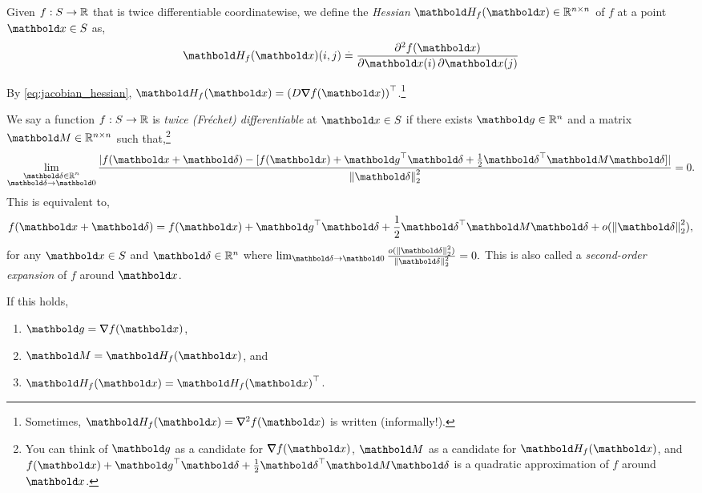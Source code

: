 \begin{defn}[Hessian] Given $f: S \to \mathbb{R}$ that is twice differentiable coordinatewise, we define the \emph{Hessian} $\mH_f(\vx) \in \R^{n \times n}$ of $f$ at a point $\vx \in \sS$ as, \begin{align}
    \mH_f(\vx)(i,j) \defeq \pdv{f(\vx)}{\vx(i),\vx(j)}
\end{align}
\end{defn}
\begin{rmk} By \cref{eq:jacobian_hessian}, $\mH_f(\vx) = \trans{(D \grad f(\vx))}$.\footnote{Sometimes, $\mH_f(\vx) = \grad^2 f(\vx)$ is written (informally!).}
\end{rmk}

\begin{defn} We say a function $f: S \to \mathbb{R}$ is \emph{twice (Fréchet) differentiable} at $\vx \in \sS$ if there exists $\vg \in \R^n$ and a matrix $\mM \in \R^{n \times n}$ such that,\footnote{You can think of $\vg$ as a candidate for $\grad f(\vx)$, $\mM$ as a candidate for $\mH_f(\vx)$, and $f(\vx) + \trans{\vg}\vdelta + \frac{1}{2}\trans{\vdelta}\mM\vdelta$ is a quadratic approximation of $f$ around $\vx$.} \begin{align}
    \lim_{\substack{\vdelta \in \R^n \\ \vdelta \to \vZero}} \frac{|f(\vx + \vdelta) - [f(\vx) + \trans{\vg}\vdelta + \frac{1}{2}\trans{\vdelta}\mM\vdelta]|}{\norm{\vdelta}_2^2} = 0.
\end{align} This is equivalent to, \begin{align}
    f(\vx + \vdelta) = f(\vx) + \trans{\vg}\vdelta + \frac{1}{2}\trans{\vdelta}\mM\vdelta + o(\norm{\vdelta}_2^2),
\end{align} for any $\vx \in \sS$ and $\vdelta \in \R^n$ where $\lim_{\vdelta \to \vZero} \frac{o(\norm{\vdelta}_2^2)}{\norm{\vdelta}_2^2} = 0.$ This is also called a \emph{second-order expansion} of $f$ around $\vx$.
\end{defn}
\begin{rmk}
If this holds, \begin{enumerate}
    \item $\vg = \grad f(\vx)$,
    \item $\mM = \mH_f(\vx)$, and
    \item $\mH_f(\vx) = \trans{\mH_f(\vx)}$.
\end{enumerate}
\end{rmk}

